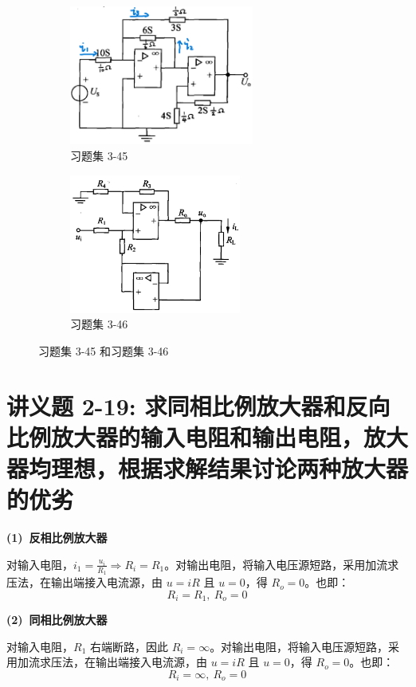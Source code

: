 \documentclass[UTF8]{report}
\theoremstyle{MyLineTheoremStyle} %
\theoremstyle{MyBlockTheoremStyle} %
\theoremstyle{MySubsubsectionStyle} %
\begin{document}
\begin{figure}[H]\centering
    \begin{subfigure}[t]{0.43\textwidth}\centering
        \includegraphics[height=130pt]{assets/3/3-45.png}
        \caption{ 习题集 3-45 }
    \end{subfigure}\begin{subfigure}[t]{0.43\textwidth}\centering
        \includegraphics[height=130pt]{assets/3/3-46.png}
        \caption{ 习题集 3-46 }
    \end{subfigure}
    \caption{ 习题集 3-45 和习题集 3-46 }
    \end{figure}
    


\section{讲义题 2-19: 求同相比例放大器和反向比例放大器的输入电阻和输出电阻，放大器均理想，根据求解结果讨论两种放大器的优劣}
\textbf{(1)\ 反相比例放大器}

对输入电阻，$i_1 = \frac{u_i}{R_1} \Longrightarrow R_i = R_1$。对输出电阻，将输入电压源短路，采用加流求压法，在输出端接入电流源，由 $u = iR$ 且 $u=0$，得 $R_o = 0$。也即：
\begin{equation}
R_i = R_1,\ R_o = 0
\end{equation}

\textbf{(2)\ 同相比例放大器}

对输入电阻，$R_1$ 右端断路，因此 $R_i = \infty$。对输出电阻，将输入电压源短路，采用加流求压法，在输出端接入电流源，由 $u = iR$ 且 $u=0$，得 $R_o = 0$。也即：
\begin{equation}
R_i = \infty,\ R_o = 0
\end{equation}
\end{document}
